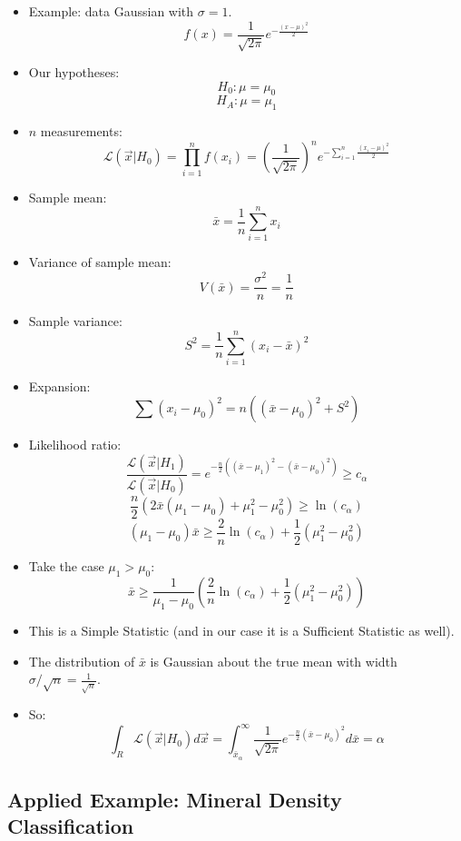 \begin{itemize}
    \item Example: data Gaussian with $\sigma = 1$.
          \[ f(x) = \frac{1}{\sqrt{2 \pi}} e^{-\frac{(x-\mu)^2}{2}} \]
    \item Our hypotheses:
          \[ H_{0}: \mu = \mu_0 \]
          \[ H_{A}: \mu = \mu_1 \]
    \item $n$ measurements:
          \[ \mathcal{L}(\vec{x} | H_{0}) = \prod_{i=1}^{n} f(x_i) = \left( \frac{1}{\sqrt{2 \pi}} \right)^n e^{-\sum_{i=1}^{n} \frac{(x_i - \mu)^2}{2}} \]
    \item Sample mean:
          \[ \bar{x} = \frac{1}{n} \sum_{i=1}^{n} x_i \]
    \item Variance of sample mean:
          \[ V(\bar{x}) = \frac{\sigma^2}{n} = \frac{1}{n} \]
    \item Sample variance:
          \[ S^2 = \frac{1}{n} \sum_{i=1}^{n} (x_i - \bar{x})^2 \]
    \item Expansion:
          \[ \sum (x_i - \mu_0)^2 = n \left((\bar{x} - \mu_0)^2 + S^2 \right) \]
    \item Likelihood ratio:
          \[ \frac{\mathcal{L}(\vec{x}|H_{1})}{\mathcal{L}(\vec{x}|H_{0})} = e^{-\frac{n}{2} \left( (\bar{x} - \mu_1)^2 - (\bar{x} - \mu_0)^2 \right)} \geq c_{\alpha} \]
          \[ \frac{n}{2} \left( 2 \bar{x} (\mu_1 - \mu_0) + \mu_1^2 - \mu_0^2 \right) \geq \ln(c_{\alpha}) \]
          \[ (\mu_1 - \mu_0) \bar{x} \geq \frac{2}{n} \ln(c_{\alpha}) + \frac{1}{2} (\mu_1^2 - \mu_0^2) \]
    \item Take the case $\mu_1 > \mu_0$:
          \[ \bar{x} \geq \frac{1}{\mu_1 - \mu_0} \left( \frac{2}{n} \ln(c_{\alpha}) + \frac{1}{2} (\mu_1^2 - \mu_0^2) \right) \]
    \item This is a Simple Statistic (and in our case it is a Sufficient Statistic as well).
    \item The distribution of $\bar{x}$ is Gaussian about the true mean with width $\sigma / \sqrt{n} = \frac{1}{\sqrt{n}}$.
    \item So:
          \[ \int_{R} \mathcal{L}(\vec{x}|H_{0}) d\vec{x} = \int_{\bar{x}_{\alpha}}^{\infty} \frac{1}{\sqrt{2 \pi}} e^{-\frac{n}{2} (\bar{x} - \mu_0)^2} d\bar{x} = \alpha \]
\end{itemize}

\subsection{Applied Example: Mineral Density Classification}

